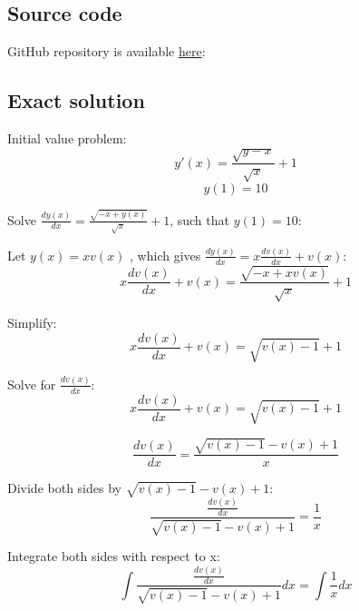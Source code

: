 \documentclass[12pt,letterpaper]{article}
\begin{document}
\begin{center}
    \section*{Source code}
\end{center}

GitHub repository is available \href{https://github.com/AlekseyKorshuk/numerical-methods}{here}:

\begin{center}
    \section*{Exact solution}
\end{center}

Initial value problem:
\begin{equation}
     y'(x) = \frac {\sqrt {y - x}}{\sqrt{x}} + 1
\end{equation}
\begin{equation}
     y(1) = 10
\end{equation}


Solve $ \frac{dy(x)}{ dx} = \frac {\sqrt{-x + y(x)}}{ \sqrt{x}} + 1$, such that $y(1) = 10$:

Let $ y(x) = xv(x)$ , which gives $ \frac{dy(x)}{dx} = x \frac{ dv(x)}{ dx} + v(x)$:
\begin{equation}
     x \frac{ dv(x)}{ dx} + v(x) = \frac{\sqrt{-x + x v(x)}}{\sqrt{x}} + 1
\end{equation}

Simplify:
\begin{equation}
     x \frac{ dv(x)}{ dx} + v(x) = \sqrt{v(x) - 1} + 1
\end{equation}

Solve for $\frac{dv(x)}{dx}$:
\begin{equation}
     x \frac{ dv(x)}{ dx} + v(x) = \sqrt{v(x) - 1} + 1
\end{equation}

\begin{equation}
     \frac{ dv(x)}{ dx} = \frac{ \sqrt{v(x) - 1} - v(x) + 1}{x}
\end{equation}

Divide both sides by $\sqrt{v(x) - 1} - v(x) + 1$:
\begin{equation}
     \frac{\frac{ dv(x)}{ dx}}{\sqrt{v(x) - 1} - v(x) + 1} = \frac{1}{x}
\end{equation}

Integrate both sides with respect to x:
\begin{equation}
    \int {
    \frac{\frac{ dv(x)}{ dx}}{\sqrt{v(x) - 1} - v(x) + 1}
    }dx = \int {\frac{1}{x}}dx
\end{equation}
\end{document}
